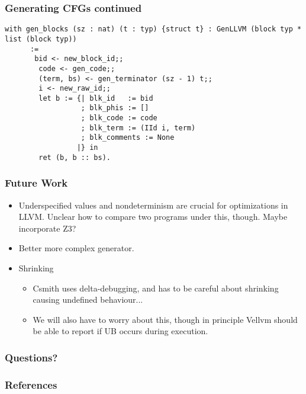 \documentclass{beamer}
\begin{document}
\begin{frame}[fragile]
  \frametitle{Generating CFGs continued}
\begin{lstlisting}[language=SSR]
  with gen_blocks (sz : nat) (t : typ) {struct t} : GenLLVM (block typ * list (block typ))
      :=
       bid <- new_block_id;;
        code <- gen_code;;
        (term, bs) <- gen_terminator (sz - 1) t;;
        i <- new_raw_id;;
        let b := {| blk_id   := bid
                  ; blk_phis := []
                  ; blk_code := code
                  ; blk_term := (IId i, term)
                  ; blk_comments := None
                 |} in
        ret (b, b :: bs).
\end{lstlisting}
\end{frame}

\begin{frame}
  \frametitle{Future Work}

  \begin{itemize}
  \item Underspecified values and nondeterminism are crucial for
    optimizations in LLVM. Unclear how to compare two programs under
    this, though. Maybe incorporate Z3?
  \item Better more complex generator.
  \item Shrinking
    \begin{itemize}
    \item Csmith uses delta-debugging, and has to be careful about
      shrinking causing undefined behaviour...
    \item We will also have to worry about this, though in principle
      Vellvm should be able to report if UB occurs during execution.
    \end{itemize}
  \end{itemize}
\end{frame}

\begin{frame}
  \frametitle{Questions?}

\end{frame}

\begin{frame}
  \frametitle{References}

  \nocite{*}
  \printbibliography
\end{frame}
\end{document}
